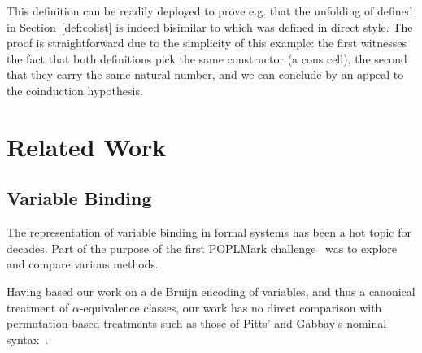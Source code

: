 {\begin{center}
\end{center}

This definition can be readily deployed to prove e.g. that the unfolding
of  defined in Section~\ref{def:colist} is indeed bisimilar to 
which was defined in direct style. The proof is straightforward due to the simplicity
of this example: the first  witnesses the fact that both definitions
pick the same constructor (a cons cell), the second that they carry the
same natural number, and we can conclude by an appeal to the coinduction
hypothesis.

\begin{center}
\end{center}





\section{Related Work}\label{section:related-work}

\subsection{Variable Binding} The representation of variable binding
in formal systems has been a hot topic for decades. Part of the purpose
of the first POPLMark challenge~\citeyear{poplmark} was to explore and
compare various methods.

Having based our work on a de Bruijn encoding of variables, and thus a
canonical treatment of \(\alpha\)-equivalence classes, our work has no
direct comparison with permutation-based treatments such as those of
Pitts' and Gabbay's nominal syntax~\citeyear{gabbay:newaas-jv}.

}
